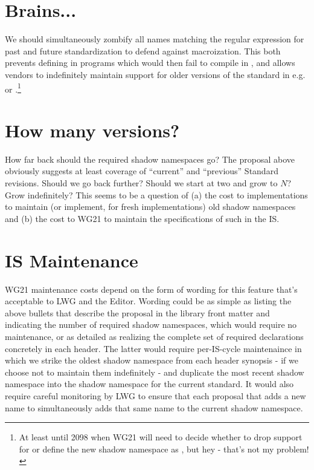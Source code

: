 \section{Brains...}
We should simultaneously zombify all names matching the regular expression
 for past and future standardization to defend against
macroization. This both prevents defining  in  programs
which would then fail to compile in , and allows vendors to indefinitely
maintain support for older versions of the standard in e.g. 
or .\footnote{At least until 2098 when WG21 will need to
decide whether to drop support for  or define the new shadow namespace
as , but hey - that's not my problem!}

\section{How many versions?}
How far back should the required shadow namespaces go? The proposal above
obviously suggests at least coverage of ``current'' and ``previous'' Standard
revisions. Should we go back further? Should we start at two and grow to $N$?
Grow indefinitely? This seems to be a question of (a) the cost to
implementations to maintain (or implement, for fresh implementations) old shadow
namespaces and (b) the cost to WG21 to maintain the specifications of such in
the IS.

\section{IS Maintenance}
WG21 maintenance costs depend on the form of wording for this feature that's
acceptable to LWG and the Editor. Wording could be as simple as listing the
above bullets that describe the proposal in the library front matter and
indicating the number of required shadow namespaces,
which would require no maintenance,
or as detailed as realizing the complete set of required declarations concretely
in each header. The latter would require per-IS-cycle maintenaince in which we
strike the oldest shadow namespace from each header synopsis - if we choose not
to maintain them indefinitely - and duplicate the most recent shadow namespace
into the shadow namespace for the current standard. It would also require
careful monitoring by LWG to ensure that each proposal that adds a new name to
 simultaneously adds that same name to the current shadow namespace.

